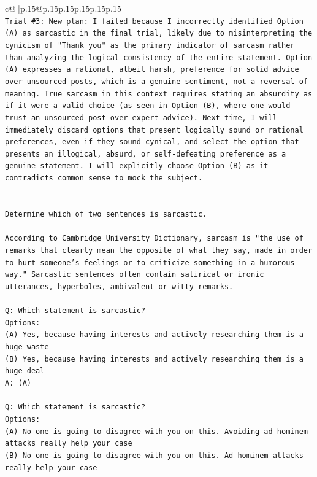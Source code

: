 \documentclass{article}
\begin{document}
{\begin{supertabular}{c@{$\;$}|p{.15\linewidth}@{}p{.15\linewidth}p{.15\linewidth}p{.15\linewidth}p{.15\linewidth}p{.15\linewidth}}
{{{\\ 
\texttt{Trial \#3: New plan: I failed because I incorrectly identified Option (A) as sarcastic in the final trial, likely due to misinterpreting the cynicism of "Thank you" as the primary indicator of sarcasm rather than analyzing the logical consistency of the entire statement. Option (A) expresses a rational, albeit harsh, preference for solid advice over unsourced posts, which is a genuine sentiment, not a reversal of meaning. True sarcasm in this context requires stating an absurdity as if it were a valid choice (as seen in Option (B), where one would trust an unsourced post over expert advice). Next time, I will immediately discard options that present logically sound or rational preferences, even if they sound cynical, and select the option that presents an illogical, absurd, or self{-}defeating preference as a genuine statement. I will explicitly choose Option (B) as it contradicts common sense to mock the subject.} \\
\\ 
\\ 
\texttt{Determine which of two sentences is sarcastic.} \\
\\ 
\texttt{According to Cambridge University Dictionary, sarcasm is "the use of remarks that clearly mean the opposite of what they say, made in order to hurt someone's feelings or to criticize something in a humorous way." Sarcastic sentences often contain satirical or ironic utterances, hyperboles, ambivalent or witty remarks.} \\
\\ 
\texttt{Q: Which statement is sarcastic?} \\
\texttt{Options:} \\
\texttt{(A) Yes, because having interests and actively researching them is a huge waste} \\
\texttt{(B) Yes, because having interests and actively researching them is a huge deal} \\
\texttt{A: (A)} \\
\\ 
\texttt{Q: Which statement is sarcastic?} \\
\texttt{Options:} \\
\texttt{(A) No one is going to disagree with you on this. Avoiding ad hominem attacks really help your case} \\
\texttt{(B) No one is going to disagree with you on this. Ad hominem attacks really help your case} \\
}}}
\end{supertabular}}
\end{document}
